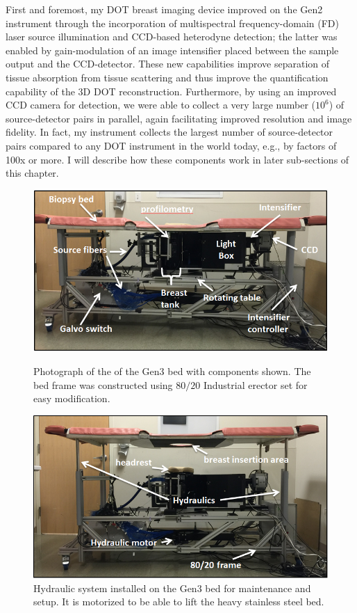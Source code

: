First and foremost, my DOT breast imaging device improved on the Gen2 instrument through the incorporation of multispectral frequency-domain (FD) laser source illumination and CCD-based heterodyne detection; the latter was enabled by gain-modulation of an image intensifier placed between the sample output and the CCD-detector. These new capabilities improve separation of tissue absorption from tissue scattering and thus improve the quantification capability of the 3D DOT reconstruction. Furthermore, by using an improved CCD camera for detection, we were able to collect a very large number ($10^6$) of source-detector pairs in parallel, again facilitating improved resolution and image fidelity. In fact, my instrument collects the largest number of source-detector pairs compared to any DOT instrument in the world today, e.g., by factors of 100x or more. I will describe how these components work in later sub-sections of this chapter.
\begin{figure}[p]
\centering
\includegraphics[width=14.5cm]{./figures/4_Gen3/gen3comppic.png}
\caption[Photograph of the of the Gen3 bed with components shown]{Photograph of the of the Gen3 bed with components shown. The bed frame was constructed using $80/20$ Industrial erector set for easy modification.}
\label{fig:gen3comppic}
\vspace{10mm}
\includegraphics[width=14.5cm]{./figures/4_Gen3/gen3hydraulics.png}
\caption{Hydraulic system installed on the Gen3 bed for maintenance and setup. It is motorized to be able to lift the heavy stainless steel bed.}
\label{fig:gen3hydraulics}
\end{figure}

